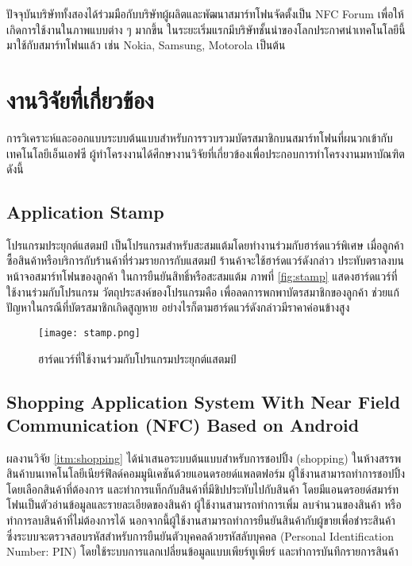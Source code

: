 \documentclass[a4paper]{article}
\begin{document}
ปัจจุบันบริษัททั้งสองได้ร่วมมือกับบริษัทผู้ผลิตและพัฒนาสมาร์ทโฟนจัดตั้งเป็น NFC Forum เพื่อให้เกิดการใช้งานในภาพแบบต่าง ๆ มากขึ้น ในระยะเริ่มแรกมีบริษัทชั้นนำของโลกประกาศนำเทคโนโลยีนี้มาใช้กับสมาร์ทโฟนแล้ว เช่น Nokia, Samsung, Motorola เป็นต้น


\section{งานวิจัยที่เกี่ยวข้อง}
การวิเคราะห์และออกแบบระบบต้นแบบสำหรับการรวบรวมบัตรสมาชิกบนสมาร์ทโฟนที่ผนวกเข้ากับเทคโนโลยีเอ็นเอฟซี ผู้ทำโครงงานได้ศึกษางานวิจัยที่เกี่ยวข้องเพื่อประกอบการทําโครงงานมหาบัณฑิต ดังนี้

\subsection{Application Stamp}
โปรแกรมประยุกต์แสตมป์ เป็นโปรแกรมสำหรับสะสมแต้มโดยทำงานร่วมกับฮาร์ดแวร์พิเศษ เมื่อลูกค้าซื้อสินค้าหรือบริการกับร้านค้าที่ร่วมรายการกับแสตมป์ ร้านค้าจะใช้ฮาร์ดแวร์ดังกล่าว ประทับตราลงบนหน้าจอสมาร์ทโฟนของลูกค้า ในการยืนยันสิทธิ์หรือสะสมแต้ม ภาพที่ \ref{fig:stamp} แสดงฮาร์ดแวร์ที่ใช้งานร่วมกับโปรแกรม วัตถุประสงค์ของโปรแกรมคือ เพื่อลดการพกพาบัตรสมาชิกของลูกค้า ช่วยแก้ปัญหาในกรณีที่บัตรสมาชิกเกิดสูญหาย อย่างไรก็ตามฮาร์ดแวร์ดังกล่าวมีราคาค่อนข้างสูง

\begin{figure}[ht!]
\centering
\texttt{[image: stamp.png]}
\caption{ฮาร์ดแวร์ที่ใช้งานร่วมกับโปรแกรมประยุกต์แสตมป์} \label{fig:stamp}
\label{overflow}
\end{figure}

\subsection{Shopping Application System With Near Field Communication (NFC) Based on Android}
ผลงานวิจัย \ref{itm:shopping} ได้นำเสนอระบบต้นแบบสำหรับการชอปปิ้ง (shopping) ในห้างสรรพสินค้าบนเทคโนโลยีเนียร์ฟิลด์คอมมูนิเคชันด้วยแอนดรอยด์แพลตฟอร์ม ผู้ใช้งานสามารถทำการชอปปิ้งโดยเลือกสินค้าที่ต้องการ และทำการแท็กกับสินค้าที่มีชิปประทับไปกับสินค้า โดยมีแอนดรอยด์สมาร์ทโฟนเป็นตัวอ่านข้อมูลและรายละเอียดของสินค้า ผู้ใช้งานสามารถทำการเพิ่ม ลบจำนวนของสินค้า หรือทำการลบสินค้าที่ไม่ต้องการได้ นอกจากนี้ผู้ใช้งานสามารถทำการยืนยันสินค้ากับผู้ขายเพื่อชำระสินค้า ซึ่งระบบจะตรวจสอบรหัสสำหรับการยืนยันตัวบุคคลด้วยรหัสลับบุคคล (Personal Identification Number: PIN) โดยใช้ระบบการแลกเปลี่ยนข้อมูลแบบเพียร์ทูเพียร์ และทำการบันทึกรายการสินค้า
\end{document}
